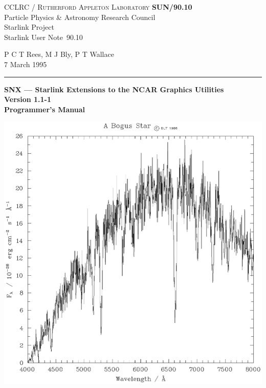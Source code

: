 \documentclass[twoside,11pt]{article}
\newcommand{\stardoccategory}  {Starlink User Note}
\newcommand{\stardocinitials}  {SUN}
\newcommand{\stardocnumber}    {90.10}
\newcommand{\stardocauthors}   {P C T Rees, M J Bly,  P T Wallace}
\newcommand{\stardocdate}      {7 March 1995}
\newcommand{\stardoctitle}     {SNX --- Starlink Extensions to
                                the NCAR Graphics Utilities}
\newcommand{\stardocversion}   {Version 1.1-1}
\newcommand{\stardocmanual}    {Programmer's Manual}
\newcommand{\stardocname}{\stardocinitials /\stardocnumber}
\newenvironment{latexonly}{}{}
\renewcommand{\_}{\texttt{\symbol{95}}}
\begin{document}
\thispagestyle{empty}

\begin{latexonly}
   CCLRC / \textsc{Rutherford Appleton Laboratory} \hfill \textbf{\stardocname}\\
   {\large Particle Physics \& Astronomy Research Council}\\
   {\large Starlink Project\\}
   {\large \stardoccategory\ \stardocnumber}
   \begin{flushright}
   \stardocauthors\\
   \stardocdate
   \end{flushright}
   \vspace{-4mm}
   \rule{\textwidth}{0.5mm}
   \vspace{5mm}
   \begin{center}
   {\Huge\textbf{\stardoctitle \\ [2.5ex]}}
   {\LARGE\textbf{\stardocversion \\ [4ex]}}
   {\Huge\textbf{\stardocmanual}}
   \end{center}
   \vspace{5mm}

   \begin{center}
   \includegraphics[scale=0.7]{sun90-fig-1}
   \end{center}

\end{latexonly}
\end{document}
